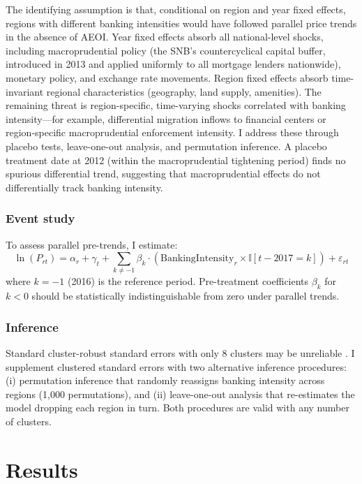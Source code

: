 \documentclass[12pt]{article}
\newcommand{\ind}{\mathbb{I}}
\begin{document}
The identifying assumption is that, conditional on region and year fixed effects, regions with different banking intensities would have followed parallel price trends in the absence of AEOI. Year fixed effects absorb all national-level shocks, including macroprudential policy (the SNB's countercyclical capital buffer, introduced in 2013 and applied uniformly to all mortgage lenders nationwide), monetary policy, and exchange rate movements. Region fixed effects absorb time-invariant regional characteristics (geography, land supply, amenities). The remaining threat is region-specific, time-varying shocks correlated with banking intensity---for example, differential migration inflows to financial centers or region-specific macroprudential enforcement intensity. I address these through placebo tests, leave-one-out analysis, and permutation inference. A placebo treatment date at 2012 (within the macroprudential tightening period) finds no spurious differential trend, suggesting that macroprudential effects do not differentially track banking intensity.

\subsubsection*{Event study} To assess parallel pre-trends, I estimate:
\begin{equation}
\ln(P_{rt}) = \alpha_r + \gamma_t + \sum_{k \neq -1} \beta_k \cdot (\text{BankingIntensity}_r \times \ind[t - 2017 = k]) + \varepsilon_{rt}
\label{eq:eventstudy}
\end{equation}
where $k = -1$ (2016) is the reference period. Pre-treatment coefficients $\beta_k$ for $k < 0$ should be statistically indistinguishable from zero under parallel trends.

\subsubsection*{Inference} Standard cluster-robust standard errors with only 8 clusters may be unreliable \citep{cameron2015practitioners}. I supplement clustered standard errors with two alternative inference procedures: (i) permutation inference that randomly reassigns banking intensity across regions (1,000 permutations), and (ii) leave-one-out analysis that re-estimates the model dropping each region in turn. Both procedures are valid with any number of clusters.


\section{Results}
\label{sec:results}
\end{document}
